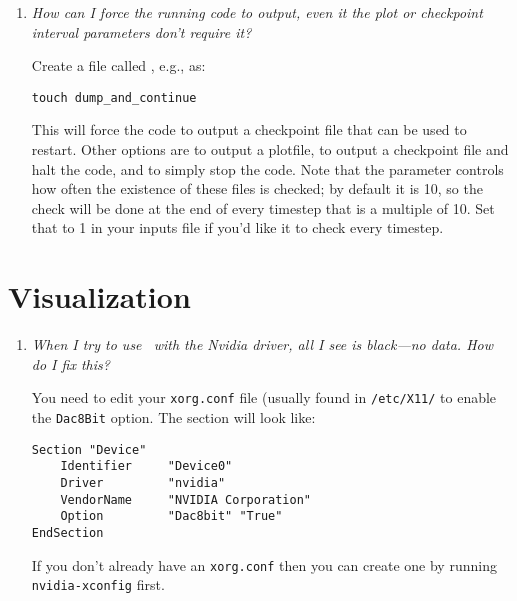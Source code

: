 \begin{enumerate}

\item {\em How can I force the running code to output, even it the plot or
 checkpoint interval parameters don't require it?}

Create a file called , e.g., as:
\begin{verbatim}
touch dump_and_continue
\end{verbatim}

This will force the code to output a checkpoint file that can be used
to restart.  Other options are  to output
a plotfile,  to output a checkpoint file
and halt the code, and  to simply stop the code.
Note that the parameter  controls how often
the existence of these files is checked; by default it is 10, so the
check will be done at the end of every timestep that is a multiple of 10.
Set that to 1 in your inputs file if you'd like it to check every timestep.

\end{enumerate}

\section{Visualization}

\label{ch:faq:vis}

\begin{enumerate}

\item {\em When I try to use \amrvis\ with the Nvidia driver, all I see is
  black---no data.  How do I fix this?}

  You need to edit your {\tt xorg.conf} file (usually found in {\tt /etc/X11/}
to enable the {\tt Dac8Bit} option.  The section will look like:
\begin{verbatim}
Section "Device"
    Identifier     "Device0"
    Driver         "nvidia"
    VendorName     "NVIDIA Corporation"
    Option         "Dac8bit" "True"
EndSection
\end{verbatim}
If you don't already have an {\tt xorg.conf} then you can create one
by running {\tt nvidia-xconfig} first.


\end{enumerate}
